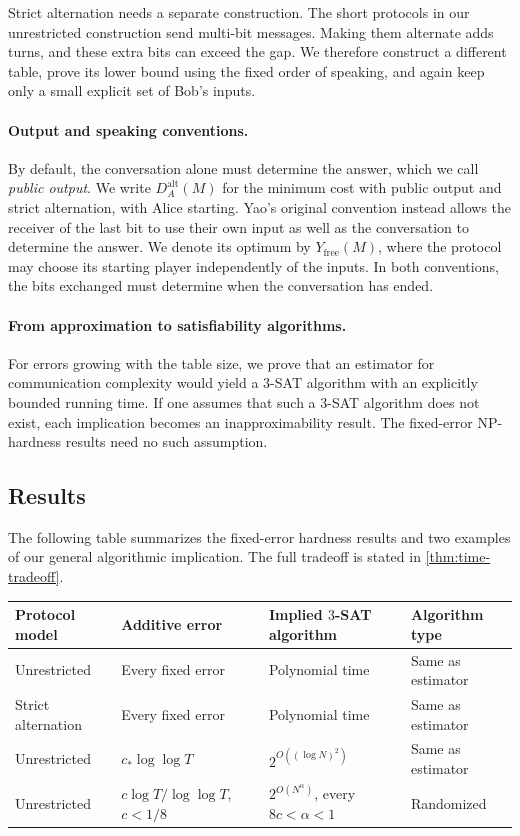 \documentclass[11pt,letterpaper]{article} \usepackage[utf8]{inputenc}
\theoremstyle{plain} \newtheorem{theorem}{Theorem}[section]
\theoremstyle{definition} \newaliascnt{definition}{theorem}
\begin{document}
Strict alternation needs a separate construction. The short protocols in our
unrestricted construction send multi-bit messages. Making them alternate
adds turns, and these extra bits can exceed the gap. We therefore
construct a different table, prove its lower bound using the fixed order of
speaking, and again keep only a small explicit set of Bob's inputs.

\paragraph{Output and speaking conventions.}
By default, the conversation alone must determine the answer, which we call
\emph{public output}. We write $D_A^{\mathrm{alt}}(M)$ for the minimum
cost with public output and strict alternation, with Alice starting.
Yao's original convention instead allows the receiver of the last bit
to use their own input as well as the conversation to determine the
answer. We denote its optimum by $Y_{\mathrm{free}}(M)$, where the
protocol may choose its starting player independently of the inputs.
In both conventions, the bits exchanged must determine when the
conversation has ended.

\paragraph{From approximation to satisfiability algorithms.}
For errors growing with the table size, we prove that an estimator for
communication complexity would yield a $3$-SAT algorithm with an
explicitly bounded running time.
If one assumes that such a $3$-SAT algorithm does not exist, each
implication becomes an inapproximability result. The fixed-error
NP-hardness results need no such assumption.

\subsection{Results}
\label{sec:results}

The following table summarizes the fixed-error hardness results and two
examples of our general algorithmic implication. The full tradeoff is
stated in \cref{thm:time-tradeoff}.

\begin{center}
\small
\begin{tabular}{@{}p{.18\linewidth}p{.27\linewidth}p{.25\linewidth}p{.19\linewidth}@{}}
\toprule
Protocol model & Additive error & Implied $3$-SAT algorithm & Algorithm type\\
\midrule
Unrestricted & Every fixed error & Polynomial time & Same as estimator\\
\addlinespace
Strict alternation & Every fixed error & Polynomial time & Same as estimator\\
\addlinespace
Unrestricted & $c_*\log\log T$ & $2^{O((\log N)^2)}$ & Same as estimator\\
\addlinespace
Unrestricted & $c\log T/\log\log T$, $c<1/8$ & $2^{O(N^\alpha)}$, every $8c<\alpha<1$ & Randomized\\
\bottomrule
\end{tabular}
\end{center}
\end{document}
